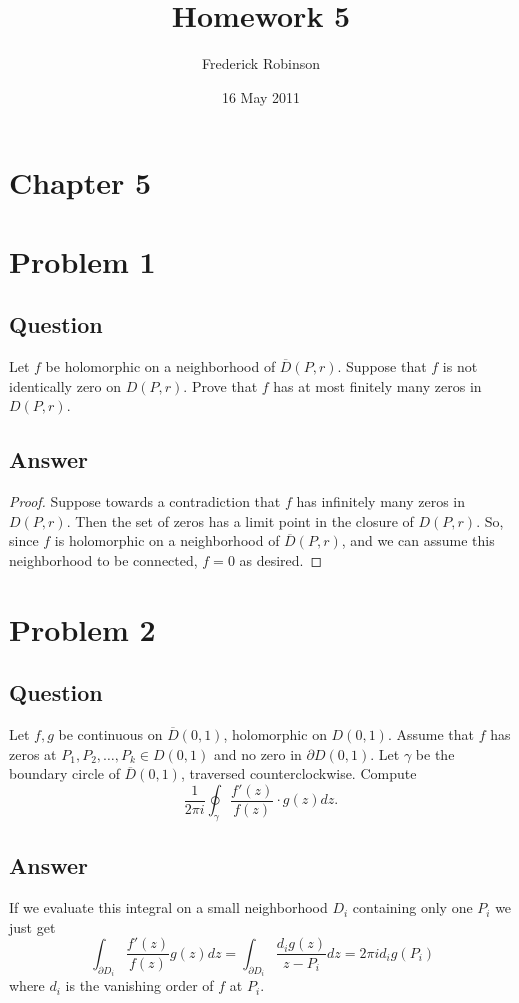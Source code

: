 \documentclass[11pt]{article}
\begin{document}



\title{Homework 5}
\author{Frederick Robinson}
\date{16 May 2011}
\maketitle


\section*{Chapter 5}

\section{Problem 1}
\subsection{Question}
Let $f$ be holomorphic on a neighborhood of $\overline{D}(P,r)$. Suppose that $f$ is not identically zero on $D(P,r)$. Prove that $f$ has at most finitely many zeros in $D(P,r)$.
\subsection{Answer}
\begin{proof}
Suppose towards a contradiction that $f$ has infinitely many zeros in $D(P,r)$.  Then the set of zeros has a limit point in the closure of $D(P,r)$. So, since $f$ is holomorphic on a neighborhood of $\overline{D}(P,r)$, and we can assume this neighborhood to be connected, $f = 0$ as desired.
\end{proof}


\section{Problem 2}
\subsection{Question}
Let $f,g$ be continuous on $\overline{D}(0,1)$, holomorphic on $D(0,1)$. Assume that $f$ has zeros at $P_1,P_2,\dots, P_k \in D(0,1)$ and no zero in $\partial D(0,1)$. Let $\gamma$ be the boundary circle of $\overline{D}(0,1)$, traversed counterclockwise. Compute
\[\frac{1}{2 \pi i } \oint_\gamma \frac{f'(z)}{f(z)} \cdot g(z) dz.\]
\subsection{Answer}
If we evaluate this integral on a small neighborhood $D_i$ containing only one $P_i$ we just get
\[\ \int_{\partial D_i} \frac{f'(z) }{f(z)} g(z) d z = \int_{\partial D_i} \frac{d_i g(z)}{z - P_i} d z = 2 \pi i d_i g(P_i) \]
where $d_i$ is the vanishing order of $f$ at $P_i$.
\end{document}
